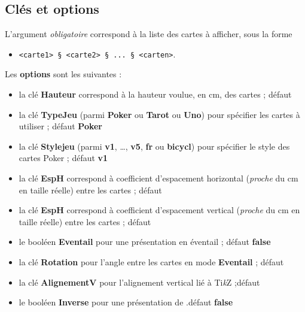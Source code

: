 \documentclass[a4paper]{article}
\providecommand\tikzlogo{Ti\textit{k}Z}
\let\TikZ\tikzlogo
\newcommand\cmaj[1]{\tcbox[vignetteMaJ]{#1}\xspace}
\newcommand\Cle[1]{{\bfseries\sffamily\textlangle #1\textrangle}}
\begin{document}
{{{{{{{{{{{\begin{codetex}
\end{codetex}

\subsection{Clés et options}

\begin{codecles}
L'argument \textit{obligatoire} correspond à la liste des cartes à afficher, sous la forme 

\begin{itemize}
	\item \texttt{<carte1> § <carte2> § ... § <carten>}.
\end{itemize}

Les \Cle{options} sont les suivantes :

\begin{itemize}
	\item la clé \Cle{Hauteur} correspond à la hauteur voulue, en cm, des cartes ; \hfill{}défaut \Cle{4.25}
	\item la clé \Cle{TypeJeu} (parmi \Cle{Poker} ou \Cle{Tarot} ou \Cle{Uno}) pour spécifier les cartes à utiliser ; \hfill{}défaut \Cle{Poker}
	\item \cmaj{0.2.4} la clé \Cle{Stylejeu} (parmi \Cle{v1}, \ldots, \Cle{v5}, \Cle{fr} ou \Cle{bicycl}) pour spécifier le style des cartes \textsf{Poker} ; \hfill{}défaut \Cle{v1}
	\item la clé \Cle{EspH} correspond à coefficient d'espacement horizontal (\textit{proche} du cm en taille réelle) entre les cartes ; \hfill{}défaut \Cle{1}
	\item la clé \Cle{EspH} correspond à coefficient d'espacement vertical (\textit{proche} du cm en taille réelle) entre les cartes ; \hfill{}défaut \Cle{0}
	\item le booléen \Cle{Eventail} pour une présentation en éventail ; \hfill{}défaut \Cle{false}
	\item la clé \Cle{Rotation} pour l'angle entre les cartes en mode \Cle{Eventail}  ; \hfill{}défaut \Cle{10}
	\item la clé \Cle{AlignementV} pour l'alignement vertical lié à \TikZ{} ;\hfill{}défaut \Cle{0.5}
	\item le booléen \Cle{Inverse} pour une présentation de .\hfill{}défaut \Cle{false}
\end{itemize}
\end{codecles}

}}}}}}}}}}}
\end{document}
